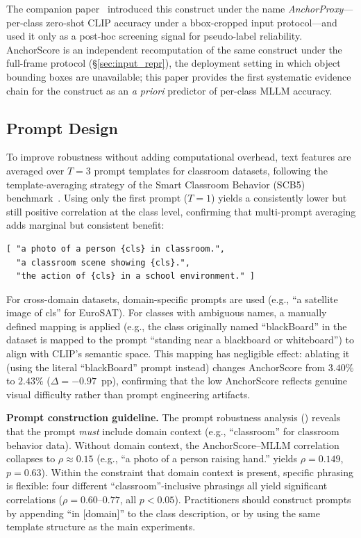 \documentclass[11pt,a4paper]{article}
\begin{document}
The companion paper~\cite{ma2026agreement} introduced this construct under the name \emph{AnchorProxy}---per-class zero-shot CLIP accuracy under a bbox-cropped input protocol---and used it only as a post-hoc screening signal for pseudo-label reliability. AnchorScore is an independent recomputation of the same construct under the full-frame protocol (\S\ref{sec:input_repr}), the deployment setting in which object bounding boxes are unavailable; this paper provides the first systematic evidence chain for the construct as an \emph{a priori} predictor of per-class MLLM accuracy.

\subsection{Prompt Design}

To improve robustness without adding computational overhead, text features are averaged over $T=3$ prompt templates for classroom datasets, following the template-averaging strategy of the Smart Classroom Behavior (SCB5) benchmark~\cite{scb_dataset}. Using only the first prompt ($T=1$) yields a consistently lower but still positive correlation at the class level, confirming that multi-prompt averaging adds marginal but consistent benefit:

{\footnotesize
\begin{verbatim}
[ "a photo of a person {cls} in classroom.",
  "a classroom scene showing {cls}.",
  "the action of {cls} in a school environment." ]
\end{verbatim}}

For cross-domain datasets, domain-specific prompts are used (e.g., ``a satellite image of {cls}'' for EuroSAT). For classes with ambiguous names, a manually defined mapping is applied (e.g., the class originally named ``blackBoard'' in the dataset is mapped to the prompt ``standing near a blackboard or whiteboard'') to align with CLIP's semantic space. This mapping has negligible effect: ablating it (using the literal ``blackBoard'' prompt instead) changes AnchorScore from $3.40\%$ to $2.43\%$ ($\Delta=-0.97$~pp), confirming that the low AnchorScore reflects genuine visual difficulty rather than prompt engineering artifacts.

\textbf{Prompt construction guideline.} The prompt robustness analysis () reveals that the prompt \emph{must} include domain context (e.g., ``classroom'' for classroom behavior data). Without domain context, the AnchorScore--MLLM correlation collapses to $\rho\approx0.15$ (e.g., ``a photo of a person raising hand.'' yields $\rho=0.149$, $p=0.63$). Within the constraint that domain context is present, specific phrasing is flexible: four different ``classroom''-inclusive phrasings all yield significant correlations ($\rho=0.60$--$0.77$, all $p<0.05$). Practitioners should construct prompts by appending ``in [domain]'' to the class description, or by using the same template structure as the main experiments.
\end{document}
